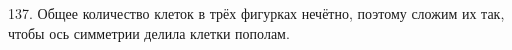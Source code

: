 137. Общее количество клеток в трёх фигурках нечётно, поэтому сложим их так, чтобы ось симметрии делила клетки пополам.
\begin{center}
\begin{figure}[ht!]
\end{figure}
\end{center}
